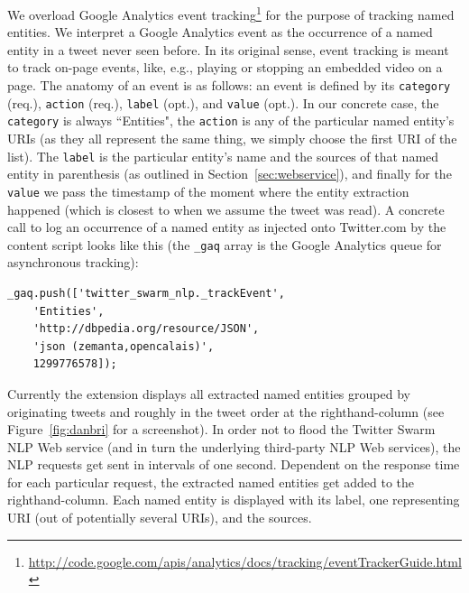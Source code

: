 \documentclass[runningheads,a4paper]{llncs}
\begin{document}
We overload Google Analytics event tracking\footnote{\url{http://code.google.com/apis/analytics/docs/tracking/eventTrackerGuide.html}} for the purpose of tracking named entities. We interpret a Google Analytics event as the occurrence of a named entity in a tweet never seen before. In its original sense, event tracking is meant to track on-page events, like, e.g., playing or stopping an embedded video on a page. The anatomy of an event is as follows: an event is defined by its \texttt{category} (req.), \texttt{action} (req.), \texttt{label} (opt.), and \texttt{value} (opt.). In our concrete case, the \texttt{category} is always ``Entities", the \texttt{action} is any of the particular named entity's URIs (as they all represent the same thing, we simply choose the first URI of the list). The \texttt{label} is the particular entity's name and the sources of that named entity in parenthesis (as outlined in Section~\ref{sec:webservice}), and finally for the \texttt{value} we pass the timestamp of the moment where the entity extraction happened (which is closest to when we assume the tweet was read). A concrete call to log an occurrence of a named entity as injected onto Twitter.com by the content script looks like this (the \texttt{\_gaq} array is the Google Analytics queue for asynchronous tracking):

\begin{lstlisting}
_gaq.push(['twitter_swarm_nlp._trackEvent',
    'Entities',
    'http://dbpedia.org/resource/JSON',
    'json (zemanta,opencalais)',
    1299776578]);
\end{lstlisting}

Currently the extension displays all extracted named entities grouped by originating tweets and roughly in the tweet order at the righthand-column (see Figure~\ref{fig:danbri} for a screenshot). In order not to flood the Twitter Swarm NLP Web service (and in turn the underlying third-party NLP Web services), the NLP requests get sent in intervals of one second. Dependent on the response time for each particular request, the extracted named entities get added to the righthand-column. Each named entity is displayed with its label, one representing URI (out of potentially several URIs), and the sources.
\end{document}
